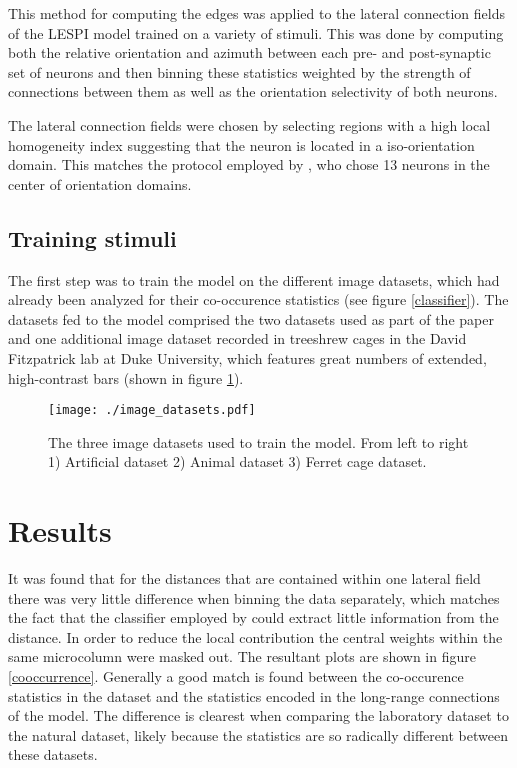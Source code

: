 This method for computing the edges was applied to the lateral
connection fields of the LESPI model trained on a variety of
stimuli. This was done by computing both the relative orientation and
azimuth between each pre- and post-synaptic set of neurons and then
binning these statistics weighted by the strength of connections
between them as well as the orientation selectivity of both neurons.

The lateral connection fields were chosen by selecting regions with a
high local homogeneity index suggesting that the neuron is located in
a iso-orientation domain. This matches the protocol employed by
\cite{Bosking1997}, who chose 13 neurons in the center of orientation
domains.

\subsection{Training stimuli}

The first step was to train the model on the different image datasets,
which had already been analyzed for their co-occurence statistics (see
figure \ref{classifier}). The datasets fed to the model comprised the
two datasets used as part of the paper and one additional image
dataset recorded in treeshrew cages in the David Fitzpatrick lab at
Duke University, which features great numbers of extended,
high-contrast bars (shown in figure \ref{datasets}).

\begin{figure}
	\centering
	\texttt{[image: ./image\_datasets.pdf]}
	\caption[]%
            {The three image datasets used to train the model. From
      left to right 1) Artificial dataset 2) Animal dataset 3) Ferret
      cage dataset.}
    \label{datasets}
\end{figure}

\section{Results}

It was found that for the distances that are contained within one
lateral field there was very little difference when binning the data
separately, which matches the fact that the classifier employed by
\cite{Perrinet2015} could extract little information from the
distance. In order to reduce the local contribution the central
weights within the same microcolumn were masked out. The resultant
plots are shown in figure \ref{cooccurrence}. Generally a good match
is found between the co-occurence statistics in the dataset and the
statistics encoded in the long-range connections of the model. The
difference is clearest when comparing the laboratory dataset to the
natural dataset, likely because the statistics are so radically
different between these datasets.

